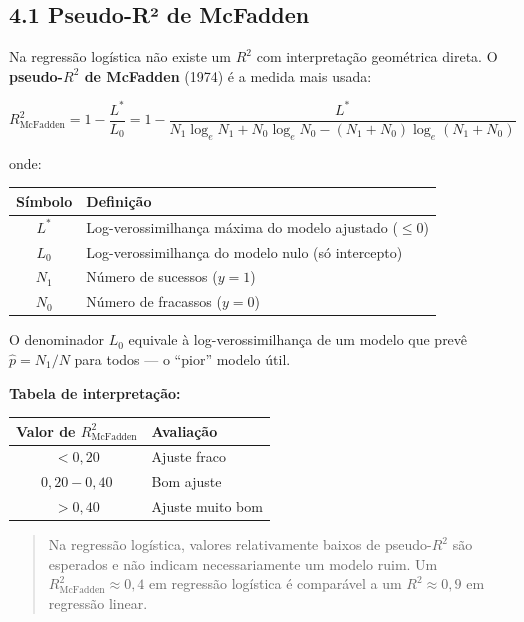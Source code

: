 \documentclass[
  letterpaper,
  DIV=11,
  numbers=noendperiod]{scrartcl}
\newcounter{none} %
\begin{document}
\subsection{4.1 Pseudo-R² de McFadden}\label{pseudo-ruxb2-de-mcfadden}

Na regressão logística não existe um \(R^2\) com interpretação
geométrica direta. O \textbf{pseudo-\(R^2\) de McFadden} (1974) é a
medida mais usada:

\[R^2_{\text{McFadden}} = 1 -\frac{L^*}{L_0} = 1 - \frac{L^*}{N_1\log_e N_1 + N_0\log_e N_0 - (N_1+N_0)\log_e(N_1+N_0)}\]

onde:

{\def\LTcaptype{none} %
\begin{longtable}[]{@{}cl@{}}
\toprule\noalign{}
Símbolo & Definição \\
\midrule\noalign{}
\endhead
\bottomrule\noalign{}
\endlastfoot
\(L^*\) & Log-verossimilhança máxima do modelo ajustado (\(\leq 0\)) \\
\(L_0\) & Log-verossimilhança do modelo nulo (só intercepto) \\
\(N_1\) & Número de sucessos (\(y = 1\)) \\
\(N_0\) & Número de fracassos (\(y = 0\)) \\
\end{longtable}
}

O denominador \(L_0\) equivale à log-verossimilhança de um modelo que
prevê \(\hat{p} = N_1/N\) para todos --- o ``pior'' modelo útil.

\textbf{Tabela de interpretação:}

{\def\LTcaptype{none} %
\begin{longtable}[]{@{}cl@{}}
\toprule\noalign{}
Valor de \(R^2_{\text{McFadden}}\) & Avaliação \\
\midrule\noalign{}
\endhead
\bottomrule\noalign{}
\endlastfoot
\(< 0{,}20\) & Ajuste fraco \\
\(0{,}20 - 0{,}40\) & Bom ajuste \\
\(> 0{,}40\) & Ajuste muito bom \\
\end{longtable}
}

\begin{quote}
Na regressão logística, valores relativamente baixos de pseudo-\(R^2\)
são esperados e não indicam necessariamente um modelo ruim. Um
\(R^2_{\text{McFadden}} \approx 0{,}4\) em regressão logística é
comparável a um \(R^2 \approx 0{,}9\) em regressão linear.
\end{quote}
\end{document}
